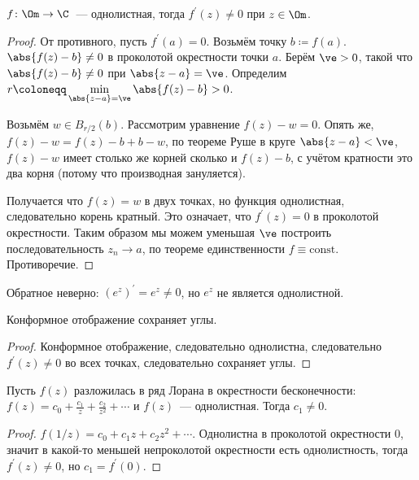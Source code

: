 \begin{theorem}
    $f\colon \Om \to \C$~--- однолистная,
    тогда $f^\prime(z) \ne 0$ при $z \in \Om$.
\end{theorem}

\begin{proof}
    От противного, пусть $f^\prime(a) = 0$.
    Возьмём точку $b \coloneqq f(a)$.
    $\abs{f(z) - b} \ne 0$ в проколотой окрестности точки $a$.
    Берём $\ve > 0$, такой что $\abs{f(z) - b} \ne 0$
    при $\abs{z-a} = \ve$. Определим
    $r \coloneqq \min\limits_{\abs{z-a} = \ve} \abs{f(z) - b}
        > 0$.

    Возьмём $w \in B_{r/2}(b)$.
    Рассмотрим уравнение $f(z) - w = 0$.
    Опять же, $f(z) - w = f(z) - b + b - w$,
    по теореме Руше в круге $\abs{z-a} < \ve$,
    $f(z)-w$ имеет столько же корней сколько и
    $f(z)-b$, с учётом кратности это два корня
    (потому что производная зануляется).

    Получается что $f(z) = w$ в двух точках,
    но функция однолистная, следовательно корень кратный.
    Это означает, что $f^\prime(z) = 0$ в проколотой окрестности.
    Таким образом мы можем уменьшая $\ve$ построить
    последовательность $z_n \to a$, по теореме единственности
    $f \equiv \mathrm{const}$. Противоречие.
\end{proof}

\begin{observation}
    Обратное неверно: $(e^z)^\prime = e^z \ne 0$,
    но $e^z$ не является однолистной.
\end{observation}

\begin{consequence}
    Конформное отображение сохраняет углы.
\end{consequence}

\begin{proof}
    Конформное отображение, следовательно однолистна,
    следовательно $f^\prime(z) \ne 0$ во всех точках,
    следовательно сохраняет углы.
\end{proof}

\begin{consequence}
    Пусть $f(z)$ разложилась в ряд Лорана
    в окрестности бесконечности: $f(z) = c_0 + \frac{c_1}{z}
        + \frac{c_2}{z^2} + \cdots$ и $f(z)$~--- однолистная.
    Тогда $c_1 \ne 0$.
\end{consequence}

\begin{proof}
    $f(1/z) = c_0 + c_1z + c_2z^2 + \cdots$.
    Однолистна в проколотой окрестности $0$,
    значит в какой-то меньшей непроколотой окрестности
    есть однолистность, тогда $f^\prime(z) \ne 0$,
    но $c_1 = f^\prime(0)$.
\end{proof}

